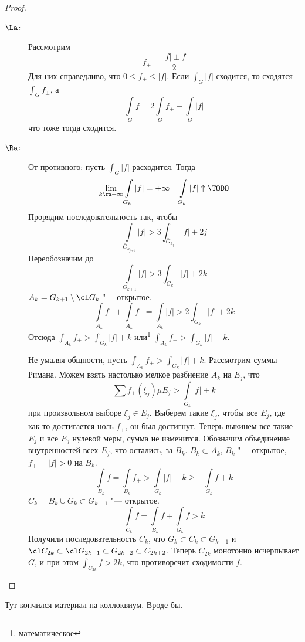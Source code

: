 \begin{proof}
	\begin{description}
	\item[$\La$:]
		Рассмотрим
		\[ f_\pm = \frac{|f| \pm f}2 \]
		Для них справедливо, что $0 \le f_\pm \le |f|$.
		Если $\int_G |f|$ сходится, то сходятся $\int_G f_\pm$, а
		\[ \int\limits_G f = 2\int\limits_G f_+ - \int\limits_G |f|\]
		что тоже тогда сходится.

	\item[$\Ra$:]
		От противного: пусть $\int_G |f|$ расходится.
		Тогда
		\[ \lim_{k \ra +\infty} \int\limits_{\bar G_k} |f| = +\infty \quad \int\limits_{\bar G_k} |f| \uparrow \TODO \]
		Прорядим последовательность так, чтобы
		\[ \int\limits_{\bar G_{k_{j+1}}} |f| > 3 \int_{\bar G_{k_j}} |f| + 2j \]
		Переобозначим до
		\[ \int\limits_{G_{k+1}} |f| > 3 \int_{G_{k}} |f| + 2k \]
		$A_k = G_{k+1} \setminus \cl G_k$ "--- открытое.
		\[ \int\limits_{A_k} f_+ + \int\limits_{A_k} f_- = \int\limits_{A_k} |f| > 2 \int_{G_{k}} |f| + 2k \]
		Отсюда $\int_{A_k} f_+ > \int_{G_{k}} |f| + k$ или\footnote{математическое} $\int_{A_k} f_- > \int_{G_{k}} |f| + k$.

		Не умаляя общности, пусть $\int_{A_k} f_+ > \int_{G_{k}} |f| + k$.
		Рассмотрим суммы Римана.
		Можем взять настолько мелкое разбиение $A_k$ на $E_j$, что
		\[ \sum f_+(\xi_j) \mu E_j > \int\limits_{G_k}|f| + k \]
		при произвольном выборе $\xi_j \in E_j$.
		Выберем такие $\xi_j$, чтобы все $E_j$, где как-то достигается ноль $f_+$, он был достигнут.
		Теперь выкинем все такие $E_j$ и все $E_j$ нулевой меры, сумма не изменится.
		Обозначим объединение внутренностей всех $E_j$, что остались, за $B_k$.
		$B_k \subset A_k$, $B_k$ "--- открытое, $f_+ = |f| > 0$ на $B_k$.
		\[ \int\limits_{B_k} f = \int\limits_{B_k} f_+ > \int\limits_{G_k} |f| + k \ge -\int\limits_{G_k} f + k \]
		$C_k = B_k \cup G_k \subset G_{k+1}$ "--- открытое.
		\[ \int\limits_{C_k} f = \int\limits_{B_k} f + \int\limits_{G_k} f > k \]
		Получили последовательность $C_k$, что $G_k \subset C_k \subset G_{k+1}$ и $\cl C_{2k} \subset \cl G_{2k+1} \subset G_{2k+2} \subset C_{2k+2}$.
		Теперь $C_{2k}$ монотонно исчерпывает $G$, и при этом $\int_{C_{2k}} f > 2k$, что противоречит сходимости $f$.
	\end{description}
\end{proof}

\begin{center}
\LARGE
Тут кончился материал на коллоквиум. Вроде бы.
\end{center}

